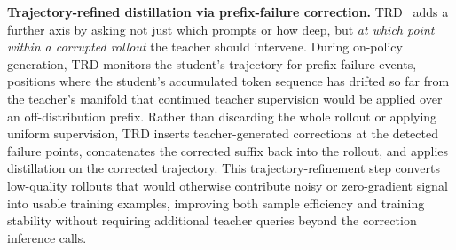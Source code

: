 \documentclass{article} %
\begin{document}
\textbf{Trajectory-refined distillation via prefix-failure correction.} TRD~\citep{2606.08432} adds a further axis by asking not just which prompts or how deep, but \emph{at which point within a corrupted rollout} the teacher should intervene. During on-policy generation, TRD monitors the student's trajectory for prefix-failure events, positions where the student's accumulated token sequence has drifted so far from the teacher's manifold that continued teacher supervision would be applied over an off-distribution prefix. Rather than discarding the whole rollout or applying uniform supervision, TRD inserts teacher-generated corrections at the detected failure points, concatenates the corrected suffix back into the rollout, and applies distillation on the corrected trajectory. This trajectory-refinement step converts low-quality rollouts that would otherwise contribute noisy or zero-gradient signal into usable training examples, improving both sample efficiency and training stability without requiring additional teacher queries beyond the correction inference calls.
\end{document}

